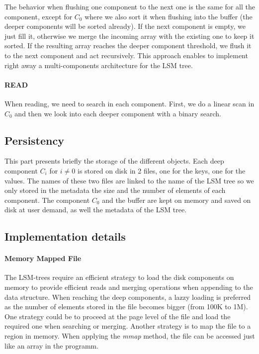 \documentclass{sig-alternate-05-2015}
\begin{document}
The behavior when flushing one component to the next one is the same for all the component, except for $C_0$ where we also sort it when flushing into the buffer (the deeper components will be sorted already). If the next component is empty, we just fill it, otherwise we merge the incoming array with the existing one to keep it sorted. If the resulting array reaches the deeper component threshold, we flush it to the next component and act recursively. This approach enables to implement right away a multi-components architecture for the LSM tree.

\paragraph{READ}

When reading, we need to search in each component. First, we do a linear scan in $C_0$ and then we look into each deeper component with a binary search.

\subsection{Persistency}

This part presents briefly the storage of the different objects. Each deep component $C_i$ for $i \neq 0$ is stored on disk in 2 files, one for the keys, one for the values. The names of these two files are linked to the name of the LSM tree so we only stored in the metadata the size and the number of elements of each component. The component $C_0$ and the buffer are kept on memory and saved on disk at user demand, as well the metadata of the LSM tree.


\subsection{Implementation details}
\paragraph{Memory Mapped File}

The LSM-trees require an efficient strategy to load the disk components on memory to provide efficient reads and merging operations when appending to the data structure. When reaching the deep components, a lazzy loading is preferred as the number of elements stored in the file becomes bigger (from 100K to 1M). One strategy could be to proceed at the page level of the file and load the required one when searching or merging. Another strategy is to map the file to a region in memory. When applying the \textit{mmap} method, the file can be accessed just like an array in the programm.
\end{document}
